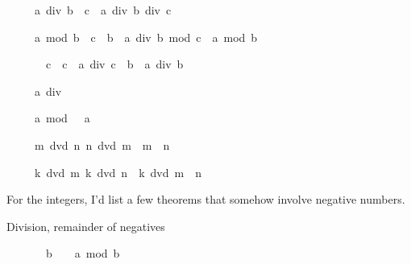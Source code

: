 \begin{isabellebody}
\begin{isamarkuptext}
\begin{isabelle}%
\ \ \ \ \ a\ div\ {\isacharparenleft}b\ {\isacharasterisk}\ c{\isacharparenright}\ {\isacharequal}\ a\ div\ b\ div\ c%
\end{isabelle}

\begin{isabelle}%
\ \ \ \ \ a\ mod\ {\isacharparenleft}b\ {\isacharasterisk}\ c{\isacharparenright}\ {\isacharequal}\ b\ {\isacharasterisk}\ {\isacharparenleft}a\ div\ b\ mod\ c{\isacharparenright}\ {\isacharplus}\ a\ mod\ b%
\end{isabelle}

\begin{isabelle}%
\ \ \ \ \ {}\ {\isacharless}\ c\ {\isasymLongrightarrow}\ c\ {\isacharasterisk}\ a\ div\ {\isacharparenleft}c\ {\isacharasterisk}\ b{\isacharparenright}\ {\isacharequal}\ a\ div\ b%
\end{isabelle}

\begin{isabelle}%
\ \ \ \ \ a\ div\ {}\ {\isacharequal}\ {}%
\end{isabelle}

\begin{isabelle}%
\ \ \ \ \ a\ mod\ {}\ {\isacharequal}\ a%
\end{isabelle}

\begin{isabelle}%
\ \ \ \ \ {\isasymlbrakk}m\ dvd\ n{\isacharsemicolon}\ n\ dvd\ m{\isasymrbrakk}\ {\isasymLongrightarrow}\ m\ {\isacharequal}\ n%
\end{isabelle}

\begin{isabelle}%
\ \ \ \ \ {\isasymlbrakk}k\ dvd\ m{\isacharsemicolon}\ k\ dvd\ n{\isasymrbrakk}\ {\isasymLongrightarrow}\ k\ dvd\ {\isacharparenleft}m\ {\isacharplus}\ n{\isacharparenright}%
\end{isabelle}

For the integers, I'd list a few theorems that somehow involve negative 
numbers.  

Division, remainder of negatives


\begin{isabelle}%
\ \ \ \ \ {\isacharhash}{}\ {\isacharless}\ b\ {\isasymLongrightarrow}\ {\isacharhash}{}\ {\isasymle}\ a\ mod\ b%
\end{isabelle}


\end{isamarkuptext}
\end{isabellebody}
